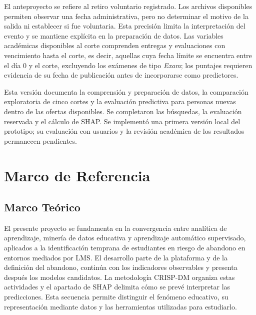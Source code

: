 El anteproyecto se refiere al retiro voluntario registrado. Los archivos disponibles permiten observar una fecha administrativa, pero no determinar el motivo de la salida ni establecer si fue voluntaria. Esta precisión limita la interpretación del evento y se mantiene explícita en la preparación de datos. Las variables académicas disponibles al corte comprenden entregas y evaluaciones con vencimiento hasta el corte, es decir, aquellas cuya fecha límite se encuentra entre el día 0 y el corte, excluyendo los exámenes de tipo \textit{Exam}; los puntajes requieren evidencia de su fecha de publicación antes de incorporarse como predictores.

Esta versión documenta la comprensión y preparación de datos, la comparación exploratoria de cinco cortes y la evaluación predictiva para personas nuevas dentro de las ofertas disponibles. Se completaron las búsquedas, la evaluación reservada y el cálculo de SHAP. Se implementó una primera versión local del prototipo; su evaluación con usuarios y la revisión académica de los resultados permanecen pendientes.

\section{Marco de Referencia}





\subsection{Marco Te\'orico}

El presente proyecto se fundamenta en la convergencia entre analítica de aprendizaje, minería de datos educativa y aprendizaje automático supervisado, aplicados a la identificación temprana de estudiantes en riesgo de abandono en entornos mediados por LMS. El desarrollo parte de la plataforma y de la definición del abandono, continúa con los indicadores observables y presenta después los modelos candidatos. La metodología CRISP-DM organiza estas actividades y el apartado de SHAP delimita cómo se prevé interpretar las predicciones. Esta secuencia permite distinguir el fenómeno educativo, su representación mediante datos y las herramientas utilizadas para estudiarlo.



